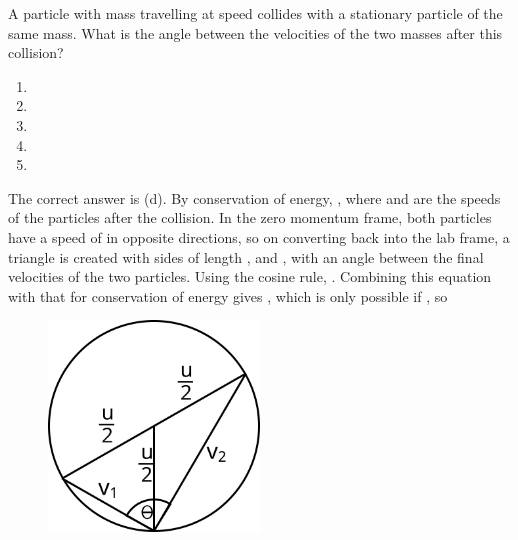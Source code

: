 
\begin{problem} 
{A particle with mass  travelling at speed   collides with a stationary particle of the same mass. What is the angle between the velocities of the two masses after this collision?
\begin{enumerate}
	\item {}
	\item {}
	\item {}
	\item {} \answer
	\item {}
\end{enumerate}
}
{}
{The correct answer is (d). By conservation of energy, , where  and  are the speeds of the particles after the collision. In the zero momentum frame, both particles have a speed of  in opposite directions, so on converting back into the lab frame, a triangle is created with sides of length ,  and  , with an angle \vari{\theta} between the final velocities of the two particles. Using the cosine rule, . Combining this equation with that for conservation of energy gives , which is only possible if , so 

\begin{figure}[h]
	\centering
	\includegraphics[width=0.5\textwidth]{../../../figures/dynamics_angle_between_identical_masses.svg}
	\caption{}\label{fig:Dynamics_angle_between_identical_masses}
\end{figure}
}
\end{problem}